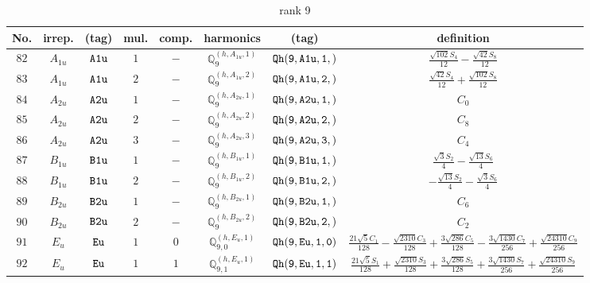 \documentclass[fleqn,8pt]{jsarticle}
\begin{document}
\begin{table}[ht!]
\begin{center}
\caption{rank 9}
\renewcommand{\arraystretch}{1.3}
\begin{tabular}{cccccccc} \hline \hline
No. & irrep. & (tag) & mul. & comp. & harmonics & (tag) & definition \\ \hline
$ 82 $ & $ A_{1u} $ & $ {\tt A1u} $ & $ 1 $ & $ - $ & $ \mathbb{Q}_{9}^{(h,A_{1u},1)} $ & $ {\tt Qh(9,A1u,1,)} $ & $ \frac{\sqrt{102} S_{4}}{12} - \frac{\sqrt{42} S_{8}}{12} $ \\
$ 83 $ & $ A_{1u} $ & $ {\tt A1u} $ & $ 2 $ & $ - $ & $ \mathbb{Q}_{9}^{(h,A_{1u},2)} $ & $ {\tt Qh(9,A1u,2,)} $ & $ \frac{\sqrt{42} S_{4}}{12} + \frac{\sqrt{102} S_{8}}{12} $ \\
$ 84 $ & $ A_{2u} $ & $ {\tt A2u} $ & $ 1 $ & $ - $ & $ \mathbb{Q}_{9}^{(h,A_{2u},1)} $ & $ {\tt Qh(9,A2u,1,)} $ & $ C_{0} $ \\
$ 85 $ & $ A_{2u} $ & $ {\tt A2u} $ & $ 2 $ & $ - $ & $ \mathbb{Q}_{9}^{(h,A_{2u},2)} $ & $ {\tt Qh(9,A2u,2,)} $ & $ C_{8} $ \\
$ 86 $ & $ A_{2u} $ & $ {\tt A2u} $ & $ 3 $ & $ - $ & $ \mathbb{Q}_{9}^{(h,A_{2u},3)} $ & $ {\tt Qh(9,A2u,3,)} $ & $ C_{4} $ \\
$ 87 $ & $ B_{1u} $ & $ {\tt B1u} $ & $ 1 $ & $ - $ & $ \mathbb{Q}_{9}^{(h,B_{1u},1)} $ & $ {\tt Qh(9,B1u,1,)} $ & $ \frac{\sqrt{3} S_{2}}{4} - \frac{\sqrt{13} S_{6}}{4} $ \\
$ 88 $ & $ B_{1u} $ & $ {\tt B1u} $ & $ 2 $ & $ - $ & $ \mathbb{Q}_{9}^{(h,B_{1u},2)} $ & $ {\tt Qh(9,B1u,2,)} $ & $ - \frac{\sqrt{13} S_{2}}{4} - \frac{\sqrt{3} S_{6}}{4} $ \\
$ 89 $ & $ B_{2u} $ & $ {\tt B2u} $ & $ 1 $ & $ - $ & $ \mathbb{Q}_{9}^{(h,B_{2u},1)} $ & $ {\tt Qh(9,B2u,1,)} $ & $ C_{6} $ \\
$ 90 $ & $ B_{2u} $ & $ {\tt B2u} $ & $ 2 $ & $ - $ & $ \mathbb{Q}_{9}^{(h,B_{2u},2)} $ & $ {\tt Qh(9,B2u,2,)} $ & $ C_{2} $ \\
$ 91 $ & $ E_{u} $ & $ {\tt Eu} $ & $ 1 $ & $ 0 $ & $ \mathbb{Q}_{9,0}^{(h,E_{u},1)} $ & $ {\tt Qh(9,Eu,1,0)} $ & $ \frac{21 \sqrt{5} C_{1}}{128} - \frac{\sqrt{2310} C_{3}}{128} + \frac{3 \sqrt{286} C_{5}}{128} - \frac{3 \sqrt{1430} C_{7}}{256} + \frac{\sqrt{24310} C_{9}}{256} $ \\
$ 92 $ & $ E_{u} $ & $ {\tt Eu} $ & $ 1 $ & $ 1 $ & $ \mathbb{Q}_{9,1}^{(h,E_{u},1)} $ & $ {\tt Qh(9,Eu,1,1)} $ & $ \frac{21 \sqrt{5} S_{1}}{128} + \frac{\sqrt{2310} S_{3}}{128} + \frac{3 \sqrt{286} S_{5}}{128} + \frac{3 \sqrt{1430} S_{7}}{256} + \frac{\sqrt{24310} S_{9}}{256} $ \\

\end{tabular}
\end{center}
\end{table}
\end{document}
